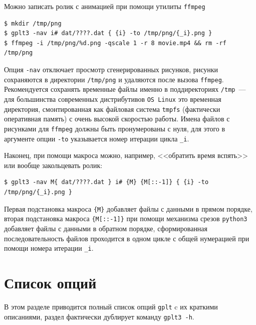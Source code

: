 \documentclass[12pt]{article}
\def\gplt{{\tt gplt}}
\def\python{{\tt python3}}
\begin{document}
Можно записать ролик с анимацией при помощи утилиты \verb'ffmpeg' 
\begin{verbatim}
$ mkdir /tmp/png
$ gplt3 -nav i# dat/????.dat { {i} -to /tmp/png/{_i}.png }
$ ffmpeg -i /tmp/png/%d.png -qscale 1 -r 8 movie.mp4 && rm -rf /tmp/png
\end{verbatim}
Опция \verb'-nav' отключает просмотр сгенерированных рисунков, рисунки сохраняются в директории \verb'/tmp/png' и удаляются после вызова \verb'ffmpeg'.
Рекомендуется сохранять временные файлы именно в поддиректориях \verb'/tmp'~--- для большинства современных дистрибутивов \verb'OS Linux'
это временная директория, смонтированная как файловая система \verb'tmpfs' (фактически оперативная память) с очень высокой скоростью работы.  
Имена файлов с рисунками для \verb'ffmpeg' должны быть пронумерованы с нуля, для этого в аргументе опции \verb'-to' указывается
номер итерации цикла \verb'_i'.

Наконец, при помощи макроса можно, например, <<обратить время вспять>> или вообще закольцевать ролик:
\begin{verbatim}
$ gplt3 -nav M{ dat/????.dat } i# {M} {M[::-1]} { {i} -to /tmp/png/{_i}.png }
\end{verbatim}
Первая подстановка макроса \verb'{M}' добавляет файлы с данными в прямом порядке, вторая подстановка макроса \verb'{M[::-1]}'
при помощи механизма срезов \python{} добавляет файлы с данными в обратном порядке, сформированная последовательность файлов проходится в одном цикле
с общей нумерацией при помощи номера итерации \verb'_i'.

\section{Список опций}\label{opt:list:sec}
\begin{figure}
  \vphantom{.}
  \vspace{-3cm}

\end{figure}
В этом разделе приводится полный список опций \gplt{} c их краткими описаниями, раздел фактически дублирует команду \verb'gplt3 -h'.
\end{document}
